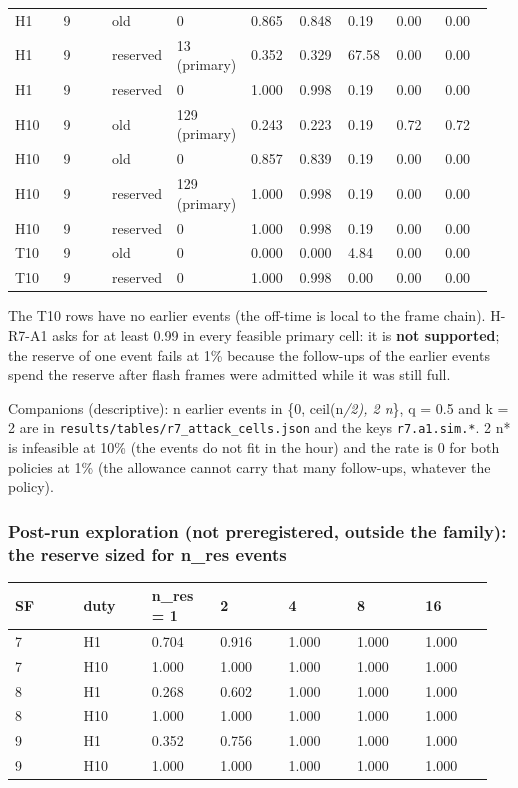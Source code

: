{\begin{longtable}{p{0.106\linewidth}p{0.106\linewidth}p{0.106\linewidth}p{0.106\linewidth}p{0.106\linewidth}p{0.106\linewidth}p{0.106\linewidth}p{0.106\linewidth}p{0.106\linewidth}}
H1 & 9 & old & 0 & 0.865 & 0.848 & 0.19 & 0.00 & 0.00 \\
H1 & 9 & reserved & 13 (primary) & 0.352 & 0.329 & 67.58 & 0.00 & 0.00 \\
H1 & 9 & reserved & 0 & 1.000 & 0.998 & 0.19 & 0.00 & 0.00 \\
H10 & 9 & old & 129 (primary) & 0.243 & 0.223 & 0.19 & 0.72 & 0.72 \\
H10 & 9 & old & 0 & 0.857 & 0.839 & 0.19 & 0.00 & 0.00 \\
H10 & 9 & reserved & 129 (primary) & 1.000 & 0.998 & 0.19 & 0.00 & 0.00 \\
H10 & 9 & reserved & 0 & 1.000 & 0.998 & 0.19 & 0.00 & 0.00 \\
T10 & 9 & old & 0 & 0.000 & 0.000 & 4.84 & 0.00 & 0.00 \\
T10 & 9 & reserved & 0 & 1.000 & 0.998 & 0.00 & 0.00 & 0.00 \\
\bottomrule
\end{longtable}}

The T10 rows have no earlier events (the off-time is local to the frame chain). H-R7-A1 asks for at least 0.99 in every feasible primary cell: it is \textbf{not supported}; the reserve of one event fails at 1\% because the follow-ups of the earlier events spend the reserve after flash frames were admitted while it was still full.

Companions (descriptive): n earlier events in \{0, ceil(n\emph{/2), 2 n}\}, q = 0.5 and k = 2 are in \texttt{results/tables/r7\_attack\_cells.json} and the keys \texttt{r7.a1.sim.*}. 2 n* is infeasible at 10\% (the events do not fit in the hour) and the rate is 0 for both policies at 1\% (the allowance cannot carry that many follow-ups, whatever the policy).

\subsubsection*{Post-run exploration (not preregistered, outside the family): the reserve sized for n\_res events}

{\scriptsize\raggedright
\begin{longtable}{p{0.136\linewidth}p{0.136\linewidth}p{0.136\linewidth}p{0.136\linewidth}p{0.136\linewidth}p{0.136\linewidth}p{0.136\linewidth}}
\toprule
SF & duty & n\_res = 1 & 2 & 4 & 8 & 16 \\
\midrule
\endhead
7 & H1 & 0.704 & 0.916 & 1.000 & 1.000 & 1.000 \\
7 & H10 & 1.000 & 1.000 & 1.000 & 1.000 & 1.000 \\
8 & H1 & 0.268 & 0.602 & 1.000 & 1.000 & 1.000 \\
8 & H10 & 1.000 & 1.000 & 1.000 & 1.000 & 1.000 \\
9 & H1 & 0.352 & 0.756 & 1.000 & 1.000 & 1.000 \\
9 & H10 & 1.000 & 1.000 & 1.000 & 1.000 & 1.000 \\
\bottomrule
\end{longtable}}

